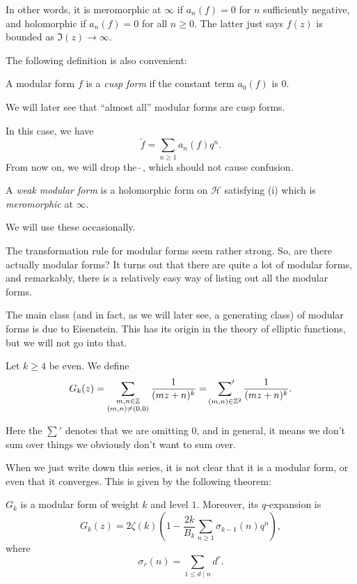 \documentclass[a4paper]{article}
\renewcommand{\H}{\mathcal{H}}
\begin{document}
In other words, it is meromorphic at $\infty$ if $a_n(f) = 0$ for $n$ sufficiently negative, and holomorphic if $a_n(f) = 0$ for all $n \geq 0$. The latter just says $f(z)$ is bounded as $\Im(z) \to \infty$.

The following definition is also convenient:
\begin{defi}
  A modular form $f$ is a \emph{cusp form} if the constant term $a_0(f)$ is $0$.
\end{defi}
We will later see that ``almost all'' modular forms are cusp forms.

In this case, we have
\[
  \tilde{f} = \sum_{n\geq 1} a_n(f) q^n.
\]
From now on, we will drop the $\tilde{\;}$, which should not cause confusion.

\begin{defi}
  A \emph{weak modular form} is a holomorphic form on $\H$ satisfying (i) which is \emph{meromorphic} at $\infty$.
\end{defi}
We will use these occasionally.

The transformation rule for modular forms seem rather strong. So, are there actually modular forms? It turns out that there are quite a lot of modular forms, and remarkably, there is a relatively easy way of listing out all the modular forms.

The main class (and in fact, as we will later see, a generating class) of modular forms is due to Eisenstein. This has its origin in the theory of elliptic functions, but we will not go into that.

\begin{defi}
  Let $k \geq 4$ be even. We define
  \[
    G_k(z) = \sum_{\substack{m, n \in \mathbb{Z}\\ (m, n) \not= (0, 0)}} \frac{1}{(mz + n)^k} = \sideset{}{'}\sum_{(m, n) \in \mathbb{Z}^2} \frac{1}{(mz + n)^k}.
  \]
\end{defi}
Here the $\sum'$ denotes that we are omitting $0$, and in general, it means we don't sum over things we obviously don't want to sum over.

When we just write down this series, it is not clear that it is a modular form, or even that it converges. This is given by the following theorem:
\begin{thm}
  $G_k$ is a modular form of weight $k$ and level $1$. Moreover, its $q$-expansion is
  \[
    G_k(z) = 2 \zeta(k) \left(1 - \frac{2k}{B_k} \sum_{n \geq 1} \sigma_{k - 1}(n) q^n\right),\tag{$1$}
  \]
  where
  \[
    \sigma_r(n) = \sum_{1 \leq d \mid n} d^r.
  \]
\end{thm}
\end{document}
